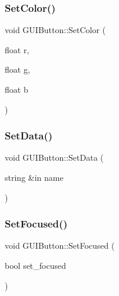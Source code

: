 \hypertarget{class_g_u_i_button_a6ed53156c1f7a332ae1a9cfc42663824}{}\label{class_g_u_i_button_a6ed53156c1f7a332ae1a9cfc42663824} 
\subsubsection{\texorpdfstring{Set\+Color()}{SetColor()}}
{\footnotesize\ttfamily void G\+U\+I\+Button\+::\+Set\+Color (\begin{DoxyParamCaption}\item[{float}]{r,  }\item[{float}]{g,  }\item[{float}]{b }\end{DoxyParamCaption})}

\hypertarget{class_g_u_i_button_a2b498afa88bf44ad48ea25493f7a7d16}{}\label{class_g_u_i_button_a2b498afa88bf44ad48ea25493f7a7d16} 
\subsubsection{\texorpdfstring{Set\+Data()}{SetData()}}
{\footnotesize\ttfamily void G\+U\+I\+Button\+::\+Set\+Data (\begin{DoxyParamCaption}\item[{string \&in}]{name }\end{DoxyParamCaption})}

\hypertarget{class_g_u_i_button_a6e0e4d39a86fe76055299c606984da34}{}\label{class_g_u_i_button_a6e0e4d39a86fe76055299c606984da34} 
\subsubsection{\texorpdfstring{Set\+Focused()}{SetFocused()}}
{\footnotesize\ttfamily void G\+U\+I\+Button\+::\+Set\+Focused (\begin{DoxyParamCaption}\item[{bool}]{set\+\_\+focused }\end{DoxyParamCaption})}

\hypertarget{class_g_u_i_button_a4fb847cc28ff6386c2272d6b9b7c03d5}{}\label{class_g_u_i_button_a4fb847cc28ff6386c2272d6b9b7c03d5} 
